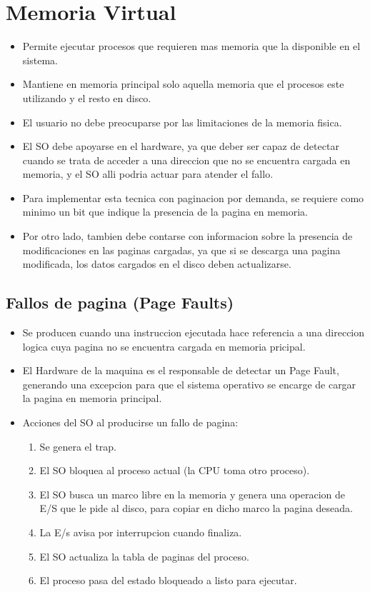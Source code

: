 \documentclass[12pt]{article}
\begin{document}
\section{Memoria Virtual}
\begin{itemize}
    \item Permite ejecutar procesos que requieren mas memoria que la disponible en el sistema.
    \item Mantiene en memoria principal solo aquella memoria que el procesos este utilizando y el resto en disco.
    \item El usuario no debe preocuparse por las limitaciones de la memoria fisica.
    \item El SO debe apoyarse en el hardware, ya que deber ser capaz de detectar cuando se trata de acceder a una direccion que no se encuentra cargada en memoria, y el SO alli podria actuar para atender el fallo.
        \item Para implementar esta tecnica con paginacion por demanda, se requiere como minimo un bit que indique la presencia de la pagina en memoria.
            \item Por otro lado, tambien debe contarse con informacion sobre la presencia de modificaciones en las paginas cargadas, ya que si se descarga una pagina modificada, los datos cargados en el disco deben actualizarse.
\end{itemize}

\subsection{Fallos de pagina (Page Faults)}
\begin{itemize}
    \item Se producen cuando una instruccion ejecutada hace referencia a una direccion logica cuya pagina no se encuentra cargada en memoria pricipal.
    \item El Hardware de la maquina es el responsable de detectar un Page Fault, generando una excepcion para que el sistema operativo se encarge de cargar la pagina en memoria principal.
        \item Acciones del SO al producirse un fallo de pagina:
        \begin{enumerate}
            \item Se genera el trap.
            \item El SO bloquea al proceso actual (la CPU toma otro proceso).
            \item El SO busca un marco libre en la memoria y genera una operacion de E/S que le pide al disco, para copiar en dicho marco la pagina deseada.
            \item La E/s avisa por interrupcion cuando finaliza.
            \item El SO actualiza la tabla de paginas del proceso.
            \item El proceso pasa del estado bloqueado a listo para ejecutar.
        \end{enumerate}
\end{itemize}
\end{document}
